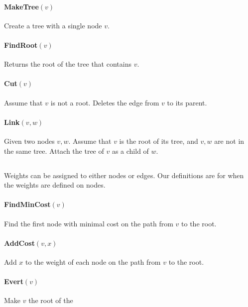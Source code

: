 \documentclass[a4paper]{article}
\begin{document}
\paragraph{MakeTree$(v)$}
Create a tree with a single node $v$.

\paragraph{FindRoot$(v)$}
Returns the root of the tree that contains $v$.

\paragraph{Cut$(v)$}
Assume that $v$ is not a root. Deletes the edge from $v$ to its parent.

\paragraph{Link$(v,w)$}
Given two nodes $v,w$.
Assume that $v$ is the root of its tree, and $v,w$ are not in the same tree.
Attach the tree of $v$ as a child of $w$.

\subsection{}
Weights can be assigned to either nodes or edges. Our definitions are for when the weights are defined on nodes.

\paragraph{FindMinCost$(v)$}
Find the first node with minimal cost on the path from $v$ to the root.

\paragraph{AddCost$(v, x)$}
Add $x$ to the weight of each node on the path from $v$ to the root.

\paragraph{Evert$(v)$}
Make $v$ the root of the 

\end{document}
